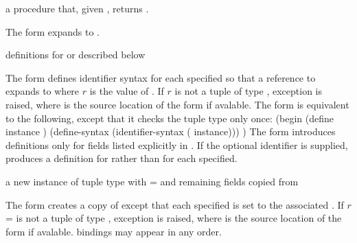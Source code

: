 \begin{syntax}
\end{syntax}
\returns{} a procedure that, given , returns .

The  form expands to .

\begin{syntax}
\end{syntax}
\expandsto{} definitions for  \etc{} or  \etc{} described below

The  form defines identifier syntax for each specified 
so that a reference to  expands to 
where $r$ is the value of .
If $r$ is not a tuple of type , exception
 is raised, where
 is the source location of the  form if avalable.
The  form is equivalent to the following, except that it
checks the tuple type only once:
\antipar\codebegin
(begin
  (define instance )
  (define-syntax  (identifier-syntax (  instance)))
  \etc{})
\codeend\antipar
The  form introduces definitions only for fields listed explicitly in .
If the optional  identifier is supplied,  produces
a definition for  rather than  for
each  specified.

\begin{syntax}
\end{syntax}
\returns{} a new instance of tuple type  with  =
 \etc{} and remaining fields copied from 

The  form creates a copy of  except that
each specified  is set to the associated . If
$r$ =  is not a tuple of type , exception
 is raised, where
 is the source location of the  form if
avalable.   bindings may appear in any order.

